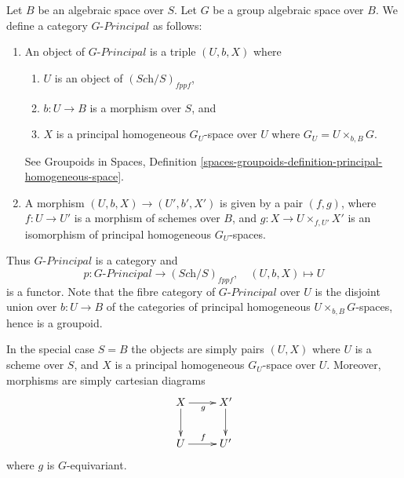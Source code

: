 \noindent
Let $B$ be an algebraic space over $S$.
Let $G$ be a group algebraic space over $B$.
We define a category $G\textit{-Principal}$ as follows:
\begin{enumerate}
\item An object of $G\textit{-Principal}$ is a triple $(U, b, X)$ where
\begin{enumerate}
\item $U$ is an object of $(\textit{Sch}/S)_{fppf}$,
\item $b : U \to B$ is a morphism over $S$, and
\item $X$ is a principal homogeneous $G_U$-space over $U$ where
$G_U = U \times_{b, B} G$.
\end{enumerate}
See
Groupoids in Spaces,
Definition \ref{spaces-groupoids-definition-principal-homogeneous-space}.
\item A morphism $(U, b, X) \to (U', b', X')$ is given
by a pair $(f, g)$, where $f : U \to U'$ is a morphism of schemes
over $B$, and $g : X \to U \times_{f, U'} X'$ is an
isomorphism of principal homogeneous $G_U$-spaces.
\end{enumerate}
Thus $G\textit{-Principal}$ is a category and
$$
p : G\textit{-Principal} \longrightarrow (\textit{Sch}/S)_{fppf},
\quad
(U, b, X) \longmapsto U
$$
is a functor. Note that the fibre category of $G\textit{-Principal}$
over $U$ is the disjoint union over $b : U \to B$
of the categories of principal homogeneous $U \times_{b, B} G$-spaces,
hence is a groupoid.

\medskip\noindent
In the special case $S = B$ the objects are simply pairs
$(U, X)$ where $U$ is a scheme over $S$, and $X$ is a principal homogeneous
$G_U$-space over $U$. Moreover, morphisms are simply cartesian
diagrams
$$
\xymatrix{
X \ar[d] \ar[r]_g & X' \ar[d] \\
U \ar[r]^f & U'
}
$$
where $g$ is $G$-equivariant.

